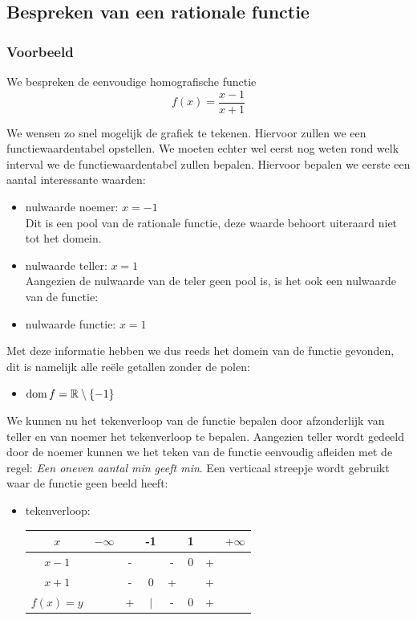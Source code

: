 \documentclass[12pt]{article}
\begin{document}
\begin{theorie}

\pagebreak
\subsection{Bespreken van een rationale functie}
\subsubsection*{Voorbeeld}
We bespreken de eenvoudige homografische functie
$$f(x)=\frac{x-1}{x+1}$$

We wensen zo snel mogelijk de grafiek te tekenen. Hiervoor zullen we een functiewaardentabel opstellen. We moeten echter wel eerst nog weten rond welk interval we de functiewaardentabel zullen bepalen. Hiervoor bepalen we eerste een aantal interessante waarden:

\begin{itemize}
  \item nulwaarde noemer: $x=-1$\\
  Dit is een pool van de rationale functie, deze waarde behoort uiteraard niet tot het domein.
  \item nulwaarde teller: $x=1$\\
  Aangezien de nulwaarde van de teler geen pool is, is het ook een nulwaarde van de functie:
  \item nulwaarde functie: $x=1$\\
\end{itemize}

Met deze informatie hebben we dus reeds het domein van de functie gevonden, dit is namelijk alle reële getallen zonder de polen:
\begin{itemize}
  \item $\dom f= \mathbb{R}\setminus \{-1\}$
\end{itemize}

We kunnen nu het tekenverloop van de functie bepalen door afzonderlijk van teller en van noemer het tekenverloop te bepalen. Aangezien teller wordt gedeeld door de noemer kunnen we het teken van de functie eenvoudig afleiden met de regel: {\em Een oneven aantal min geeft min}. Een verticaal streepje wordt gebruikt waar de functie geen beeld heeft:

\begin{itemize}
  \item tekenverloop:
  \begin{center}
    \begin{tabular}{c|ccccccc}
    $x$ & $-\infty$ & & -1 & & 1 & & $+\infty$\\
    \hline
    $x-1$ & & - &   & - & 0 & + & \\
    $x+1$ & & - & 0 & + &   & + & \\
    \hline
    $f(x)=y$ & & + & $|$ & - & 0 & +
    \end{tabular}
  \end{center}
\end{itemize}


\end{theorie}
\end{document}
